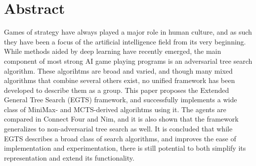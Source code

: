 \section*{Abstract}

Games of strategy have always played a major role in human culture, and as such they have been a focus of the artificial intelligence field from its very beginning. While methods aided by deep learning have recently emerged, the main component of most strong AI game playing programs is an adversarial tree search algorithm. These algorihtms are broad and varied, and though many mixed algorithms that combine several others exist, no unified framework has been developed to describe them as a group. This paper proposes the Extended General Tree Search (EGTS) framework, and successfully implements a wide class of MiniMax- and MCTS-derived algorihtms using it. The agents are compared in Connect Four and Nim, and it is also shown that the framework generalizes to non-adversarial tree search as well. It is concluded that while EGTS describes a broad class of search algorithms, and improves the ease of implementation and experimentation, there is still potential to both simplify its representation and extend its functionality.